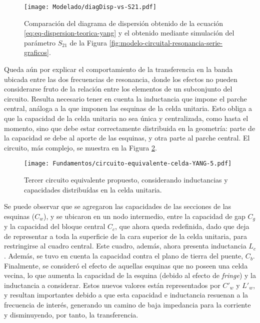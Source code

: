 \begin{figure}[h]
	\centering
	\texttt{[image: Modelado/diagDisp-vs-S21.pdf]}
	\caption{Comparación del diagrama de dispersión obtenido de la ecuación \ref{eq:eq-dispersion-teorica-yang} y el obtenido mediante simulación del parámetro $S_{21}$ de la Figura \ref{fig:modelo-circuital-resonancia-serie-graficos}.}
	\label{fig:diagDisp-vs-S21}
\end{figure}


Queda aún por explicar el comportamiento de la transferencia en la banda ubicada entre las dos frecuencias de resonancia, donde los efectos no pueden considerarse fruto de la relación entre los elementos de un subconjunto del circuito. Resulta necesario tener en cuenta la inductancia que impone el parche central, análoga a la que imponen las esquinas de la celda unitaria. Esto obliga a que la capacidad de la celda unitaria no sea única y centralizada, como hasta el momento, sino que debe estar correctamente distribuida en la geometría: parte de la capacidad se debe al aporte de las esquinas, y otra parte al parche central. El circuito, más complejo, se muestra en la Figura \ref{fig:modelo-circuital-todojunto-sinR}.

\begin{figure}[h]
	\centering
	\texttt{[image: Fundamentos/circuito-equivalente-celda-YANG-5.pdf]}
	\caption{Tercer circuito equivalente propuesto, considerando inductancias y capacidades distribuídas en la celda unitaria.}
	\label{fig:modelo-circuital-todojunto-sinR}
\end{figure}

Se puede observar que se agregaron las capacidades de las secciones de las esquinas ($C_w$), y se ubicaron en un nodo intermedio, entre la capacidad de gap $C_g$ y la capacidad del bloque central $C_c$, que ahora queda redefinida, dado que deja de representar a toda la superficie de la cara superior de la celda unitaria, para restringirse al cuadro central. Este cuadro, además, ahora presenta inductancia $L_c$. Además, se tuvo en cuenta la capacidad contra el plano de tierra del puente, $C_b$. Finalmente, se consideró el efecto de aquellas esquinas que no poseen una celda vecina, lo que aumenta la capacidad de la esquina (debido al efecto de \textit{fringe}) y la inductancia a considerar. Estos nuevos valores están representados por $C'_w$ y $L'_w$, y resultan importantes debido a que esta capacidad e inductancia resuenan a la frecuencia de interés, generando un camino de baja impedancia para la corriente y disminuyendo, por tanto, la transferencia.

